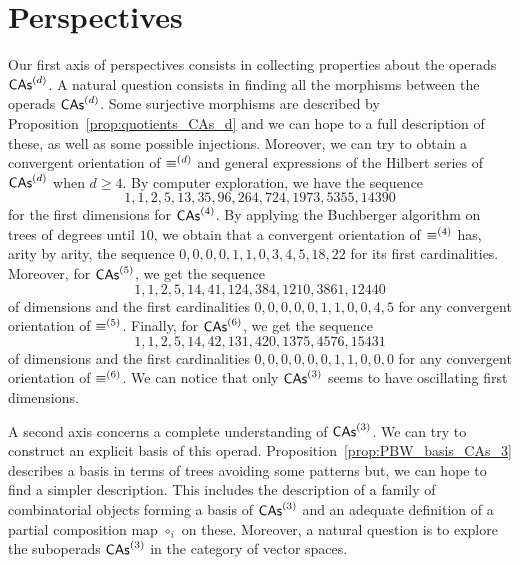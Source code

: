 \section*{Perspectives}

Our first axis of perspectives consists in collecting properties about
the operads $\mathsf{CAs}^{\left(d\right)}$. A natural question consists in finding all the
morphisms between the operads $\mathsf{CAs}^{\left(d\right)}$. Some surjective morphisms are
described by Proposition~\ref{prop:quotients_CAs_d} and we can hope to a
full description of these, as well as some possible injections.
Moreover, we can try to obtain a convergent orientation of
$\operatorname{\equiv}^{(d)}$ and general expressions of the Hilbert series of
$\mathsf{CAs}^{\left(d\right)}$ when $d \geq 4$. By computer exploration, we have the sequence
\begin{equation}
    1, 1, 2, 5, 13, 35, 96, 264, 724, 1973, 5355, 14390
\end{equation}
for the first dimensions for $\mathsf{CAs}^{\left(4\right)}$. By applying the Buchberger
algorithm on trees of degrees until $10$, we obtain that a convergent
orientation of $\operatorname{\equiv}^{(4)}$ has, arity by arity, the sequence
\begin{math}
    0, 0, 0, 0, 1, 1, 0, 3, 4, 5, 18, 22
\end{math}
for its first cardinalities. Moreover, for $\mathsf{CAs}^{\left(5\right)}$, we get the
sequence
\begin{equation}
    1, 1, 2, 5, 14, 41, 124, 384, 1210, 3861, 12440
\end{equation}
of dimensions and the first cardinalities
\begin{math}
    0, 0, 0, 0, 0, 1, 1, 0, 0, 4, 5
\end{math}
for any convergent orientation of $\operatorname{\equiv}^{(5)}$. Finally, for
$\mathsf{CAs}^{\left(6\right)}$, we get the sequence
\begin{equation}
    1, 1, 2, 5, 14, 42, 131, 420, 1375, 4576, 15431
\end{equation}
of dimensions and the first cardinalities
\begin{math}
    0, 0, 0, 0, 0, 0, 1, 1, 0, 0, 0
\end{math}
for any convergent orientation of $\operatorname{\equiv}^{(6)}$. We can notice that
only $\mathsf{CAs}^{\left(3\right)}$ seems to have oscillating first dimensions.
\medbreak

A second axis concerns a complete understanding of $\mathsf{CAs}^{\left(3\right)}$. We can
try to construct an explicit basis of this operad.
Proposition~\ref{prop:PBW_basis_CAs_3} describes a basis in terms of
trees avoiding some patterns but, we can hope to find a simpler
description. This includes the description of a family of combinatorial
objects forming a basis of $\mathsf{CAs}^{\left(3\right)}$ and an adequate definition of a
partial composition map $\circ_i$ on these. Moreover, a natural
question is to explore the suboperads $\mathsf{CAs}^{\left(3\right)}$ in the category of
vector spaces.
\medbreak

